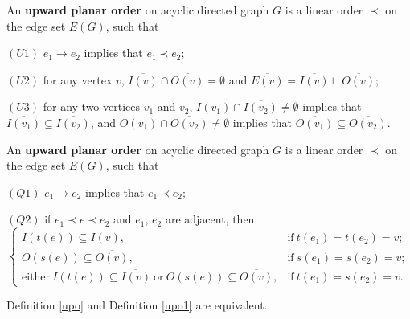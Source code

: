 \documentclass[10pt,a4paper]{amsart}
\begin{document}
\begin{defn}\label{upo}
An \textbf{upward planar order} on acyclic directed graph $G$ is a linear order $\prec$ on the edge set $E(G)$, such that

$(U1)$ $e_1\to e_2$ implies that $e_1\prec e_2$;

$(U2)$ for any vertex $v$, $\overline{I(v)}\cap \overline{O(v)}=\emptyset$ and $\overline{E(v)}=\overline{I(v)}\sqcup \overline{O(v)}$;

$(U3)$ for any two  vertices $v_1$ and $v_2$, $I(v_1)\cap \overline{I(v_2)}\neq\emptyset$ implies that $\overline{I(v_1)}\subseteq \overline{I(v_2)}$, and $O(v_1)\cap \overline{O(v_2)}\neq\emptyset$ implies that $\overline{O(v_1)}\subseteq \overline{O(v_2)}$.
\end{defn}

\begin{defn}\label{upo1}
An \textbf{upward planar order} on acyclic directed graph $G$ is a linear order $\prec$ on the edge set $E(G)$, such that

$(Q1)$ $e_1\rightarrow e_2$ implies that $e_1\prec e_2$;

$(Q2)$ if $e_1\prec e\prec e_2$ and $e_1$, $e_2$ are adjacent, then
\begin{equation*}
\begin{cases}
I(t(e))\subseteq \overline{I(v)},&  \text{if}\ t(e_1)=t(e_2)=v;\\
O(s(e))\subseteq \overline{O(v)},&  \text{if}\ s(e_1)=s(e_2)=v;\\
\text{either}\ I(t(e))\subseteq \overline{I(v)}\  \text{or}\ O(s(e))\subseteq \overline{O(v)},&  \text{if}\ t(e_1)=s(e_2)=v.
\end{cases}
\end{equation*}
\end{defn}

\begin{thm}\label{eq}
Definition \ref{upo} and Definition \ref{upo1} are equivalent.
\end{thm}
\end{document}
